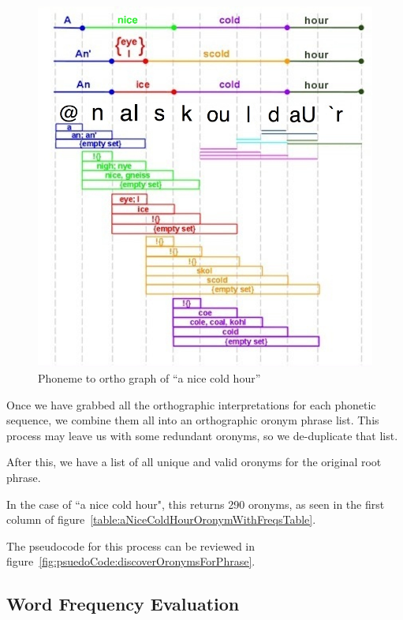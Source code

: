 \begin{figure}[h]
\includegraphics[width=\textwidth]{aNiceColdHourPhoneToOrthoBreakdown.jpg}
\captionfonts
\caption[Phoneme to ortho graph of ``a nice cold hour'']{Phoneme to ortho graph of ``a nice cold hour''}
\label{fig:aNiceColdHourPhoneToOrthoGraph}
\end{figure}

Once we have grabbed all the orthographic interpretations for each phonetic sequence, we combine them all into an orthographic oronym phrase list. This process may leave us with some redundant oronyms, so we de-duplicate that list.

After this, we have a list of all unique and valid oronyms for the original root phrase.

In the case of ``a nice cold hour", this returns 290 oronyms, as seen in the first column of figure~\ref{table:aNiceColdHourOronymWithFreqsTable}.



The pseudocode for this process can be reviewed in figure~\ref{fig:psuedoCode:discoverOronymsForPhrase}.





\subsection{Word Frequency Evaluation}
\label{subsection:wordFrequencyEvaluation}

